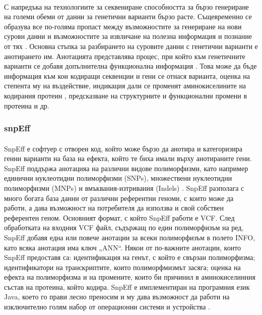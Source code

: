 \documentclass[pdftex,cyrillic,14pt,a4page,twoside,openright]{extreport}
\begin{document}
\paragraph{}
С напредъка на технологиите за секвениране способността за бързо генериране на големи обеми от данни за генетични варианти бързо расте. Същевременно се образува все по-голяма пропаст между възможностите за генериране на нови сурови данни и възможностите за извличане на полезна информация и познание от тях \cite{yang2015}. Основна стъпка за разбирането на суровите данни с генетични варианти е анотирането им. Анотацията представлява процес, при който към генетичните варианти се добавя допълнителна функционална информация \cite{mccarthy2014}. Това може да бъде информация към кои кодиращи секвенции и гени се отнася варианта, оценка на степента му на въздействие, индикация дали се променят аминокиселините на кодирания протеин \cite{cingolani2012}, предсказване на структурните и функционални промени в протеина \cite{mccarthy2014} и др.
\subsubsection{snpEff}
\paragraph{}
SnpEff е софтуер с отворен код, който може бързо да анотира и категоризира генни варианти на база на ефекта, който те биха имали върху анотираните гени. SnpEff поддържа анотацияа на различни видове полиморфизми, като например единични нуклеотидни полиморфизми (SNPs), множествени нуклеотидни полиморфизми (MNPs) и вмъквания-изтривания (Indels) \cite{cingolani2012}. SnpEff разполага с много богата база данни от различни референтни геноми, с които може да работи, а дава възможност на потребителя да използва и свой собствен референтен геном. Основният формат, с който SnpEff работи е VCF. След обработката на входния VCF файл, съдържащ по един полиморфизъм на ред, SnpEff добавя една или повече анотации за всеки полиморфизъм в полето INFO, като всяка анотация има ключ „ANN“. Някои от по-важните анотации, които SnpEff предоставя са: идентификация на генът, с който е свързан полиморфизма; идентификатори на транскриптите, които полиморфмизмът засяга; оценка на ефекта на полиморфизма и на промените, които би причинил в аминокиселинния състав на протеина, който кодира. SnpEff е имплементиран на програмния език Java, което го прави лесно преносим и му дава възможност да работи на изключително голям набор от операционни системи и устройства \cite[стр. 9-10]{schildt2020complete}.
\end{document}
